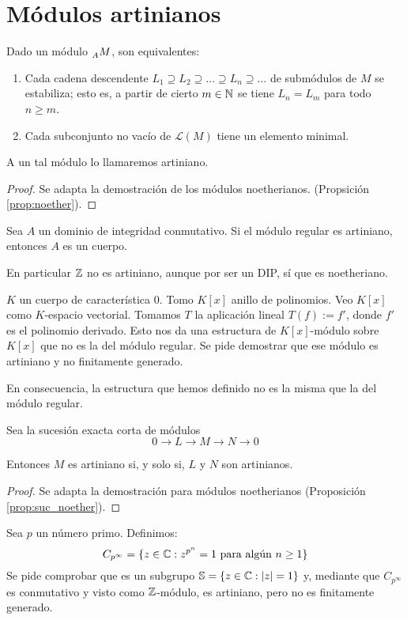 \section{Módulos artinianos}

\begin{prop}
  Dado un módulo \(\prescript{}{A}{M}\), son equivalentes:
  \begin{enumerate}
    \item Cada cadena descendente
      \(L_1\supseteq L_2\supseteq\ldots\supseteq L_n\supseteq\ldots\)
      de submódulos de \(M\)
      se estabiliza; esto es, a partir de cierto \(m \in \mathbb{N}\)
      se tiene \(L_n = L_m\) para todo \(n \ge m\).
    \item Cada subconjunto no vacío de \(\mathcal{L}(M)\) tiene un elemento
      minimal.
  \end{enumerate}
  A un tal módulo lo llamaremos artiniano.
\end{prop}
\begin{proof}
  Se adapta la demostración de los módulos noetherianos. (Propsición \ref{prop:noether}).
\end{proof}

\begin{ejercicio}
  Sea \(A\) un dominio de integridad conmutativo. Si el
  módulo regular es artiniano, entonces \(A\) es un cuerpo.
\end{ejercicio}

En particular \(\mathbb{Z}\) no es artiniano, aunque por ser un DIP, sí que
es noetheriano.

\begin{ejercicio}
  \(K\) un cuerpo de característica 0. Tomo \(K[x]\) anillo
  de polinomios. Veo \(K[x]\) como \(K\)-espacio vectorial.
  Tomamos \(T\) la aplicación lineal \(T(f):=f'\), donde \(f'\) es el
  polinomio derivado. Esto nos da una estructura de \(K[x]\)-módulo
  sobre \(K[x]\) que no es la del módulo regular. Se pide demostrar
  que ese módulo es artiniano y no finitamente generado.
\end{ejercicio}

En consecuencia, la estructura que hemos definido no es la misma
que la del módulo regular.

\begin{prop}
  Sea la sucesión exacta corta de módulos
  \[
    0\longrightarrow L\longrightarrow M\longrightarrow N\longrightarrow 0
  \]

  Entonces \(M\) es artiniano si, y solo si, \(L\) y \(N\) son artinianos.
\end{prop}
\begin{proof}
  Se adapta la demostración para módulos noetherianos (Proposición \ref{prop:suc_noether}).
\end{proof}

\begin{ejercicio}
  Sea \(p\) un número primo. Definimos:
  \[
    C_{p^\infty}=\{z\in\mathbb{C}:z^{p^n}=1\textrm{ para algún } n\ge1\}
  \]
  Se pide comprobar que es un subgrupo \(\mathbb{S}=\{z\in\mathbb{C}:\left|z\right|=1\}\) y, mediante que
  \(C_{p^\infty}\) es conmutativo y visto como \(\mathbb{Z}\)-módulo, es artiniano, pero no es
  finitamente generado.
\end{ejercicio}

